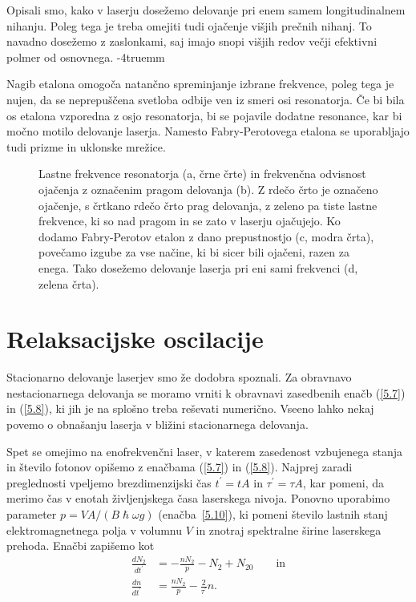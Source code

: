 Opisali smo, kako v laserju dosežemo delovanje pri enem samem longitudinalnem nihanju.
Poleg tega je treba omejiti tudi ojačenje višjih prečnih nihanj. To navadno 
dosežemo z zaslonkami, saj imajo snopi višjih redov večji efektivni polmer od osnovnega. 
\vglue-4truemm
\begin{remark}
Nagib etalona omogoča natančno spreminjanje izbrane frekvence, poleg tega
 je nujen, da se neprepuščena svetloba odbije ven iz smeri osi resonatorja. Če bi 
bila os etalona vzporedna z osjo resonatorja, bi se pojavile dodatne resonance, 
kar bi močno motilo delovanje laserja. Namesto Fabry-Perotovega etalona se uporabljajo
tudi prizme in uklonske mrežice.
\end{remark}
\begin{figure}[ht]
\centering
\def\svgwidth{94truemm} 

\caption{Lastne frekvence resonatorja (a, črne črte) in frekvenčna odvisnost 
ojačenja z označenim pragom delovanja (b). Z rdečo črto je označeno ojačenje, s črtkano
rdečo črto prag delovanja, z zeleno pa tiste 
lastne frekvence, ki so nad pragom in se zato v laserju ojačujejo. 
Ko dodamo Fabry-Perotov etalon z dano prepustnostjo (c, modra črta), povečamo
izgube za vse načine, ki bi sicer bili ojačeni, razen za enega. 
Tako dosežemo delovanje laserja pri eni sami frekvenci (d, zelena črta).}
\label{fig:FPmodes}
\end{figure}

\section{Relaksacijske oscilacije}
Stacionarno delovanje laserjev smo že dodobra spoznali. Za obravnavo
nestacionarnega delovanja  se moramo vrniti k obravnavi zasedbenih enačb 
(\ref{5.7}) in (\ref{5.8}), ki jih je na splošno treba reševati numerično. 
Vseeno lahko nekaj povemo o obnašanju laserja
v bližini stacionarnega delovanja. 

Spet se omejimo na enofrekvenčni laser, v katerem zasedenost vzbujenega stanja
in število fotonov opišemo z enačbama (\ref{5.7})
in (\ref{5.8}). Najprej zaradi preglednosti vpeljemo
brezdimenzijski čas $t^{\prime}=t A$ in $\tau^{\prime}=\tau A$, kar pomeni, da merimo 
čas v enotah življenjskega časa laserskega nivoja. Ponovno uporabimo parameter
$p=VA/(B\hslash\omega g)$ (enačba~\ref{5.10}), ki pomeni število lastnih stanj 
elektromagnetnega polja v volumnu $V$ in znotraj spektralne širine laserskega prehoda. 
Enačbi zapišemo kot
\begin{align}  
\frac{d N_2}{d t^{\prime}}&=-\frac{nN_2}{p}-N_2+N_{20} \label{5.23a} \qquad \mathrm{in}\\
\frac{d n}{d t^{\prime}}& =  \frac{nN_2}{p}-\frac{2}{\tau^{\prime}}n.
\label{5.23}
\end{align}


